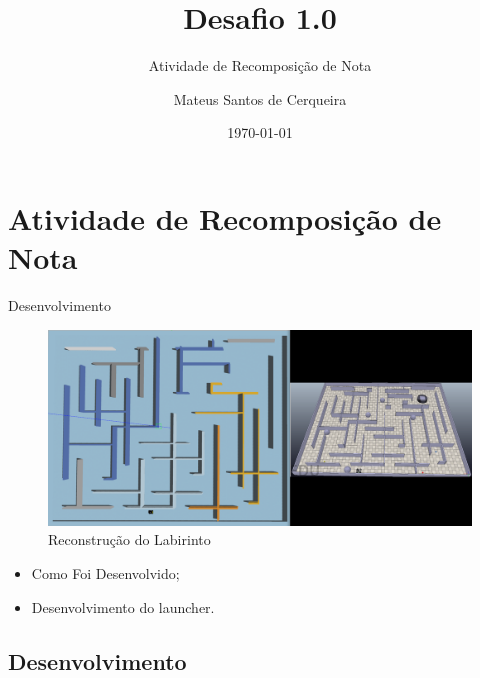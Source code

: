 \documentclass{beamer}
\title{Desafio 1.0}
\subtitle{Atividade de Recomposição de Nota}
\author{Mateus Santos de Cerqueira}
\institute{Laboratório de Robotica e Sistemas Autônomos SENAI}
\date{\today}
\begin{document}
    \begin{frame}
        \titlepage
    \end{frame}
    
    \section{Atividade de Recomposição de Nota}
      
            \begin{frame}{Desenvolvimento}
                \begin{figure}[htb]
                    \centering
                    \includegraphics[scale=0.18]{figuras/world_compare.png}                   
                    \caption{Reconstrução do Labirinto}
                    \label{}                    
                \end{figure}
                \begin{itemize}
                    \item Como Foi Desenvolvido;
                    \item Desenvolvimento do launcher. 
                \end{itemize}              
                           
            \end{frame}
            
        \subsection{Desenvolvimento}
\end{document}
